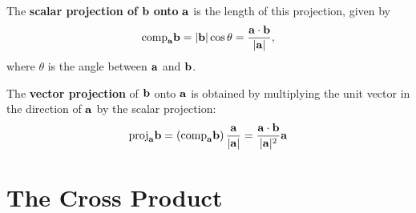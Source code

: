 \documentclass{report}
\begin{document}
The \textbf{scalar projection of} $\mathbf{b}$ \textbf{onto} $\mathbf{a}$ is the length of this 
projection, given by
\[
\text{comp}_{\mathbf{a}} \mathbf{b} = |\mathbf{b}|\cos\theta = \frac{\mathbf{a} \cdot \mathbf{b}}{|\mathbf{a}|},
\]
where $\theta$ is the angle between $\mathbf{a}$ and $\mathbf{b}$.

The \textbf{vector projection} of $\mathbf{b}$ onto $\mathbf{a}$ is obtained by multiplying the 
unit vector in the direction of $\mathbf{a}$ by the scalar projection:
\[
\text{proj}_{\mathbf{a}} \mathbf{b} = \left(\text{comp}_{\mathbf{a}} \mathbf{b} \right)\frac{\mathbf{a}}{|\mathbf{a}|} 
= \frac{\mathbf{a} \cdot \mathbf{b}}{|\mathbf{a}|^2}\mathbf{a}
\]

\section{The Cross Product}
\end{document}
